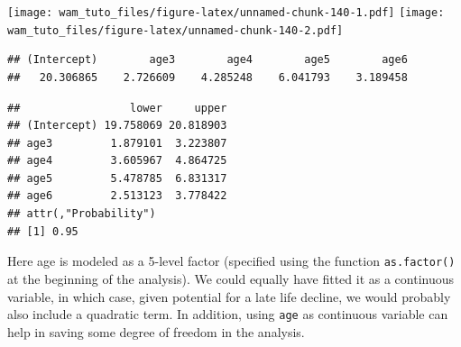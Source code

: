 \documentclass[
  12pt,
]{book}
\newenvironment{Shaded}{\begin{snugshade}}{\end{snugshade}}
\newcommand{\FloatTok}[1]{\textcolor[rgb]{0.00,0.00,0.81}{#1}}
\newcommand{\KeywordTok}[1]{\textcolor[rgb]{0.13,0.29,0.53}{\textbf{#1}}}
\newcommand{\NormalTok}[1]{#1}
\newcommand{\OperatorTok}[1]{\textcolor[rgb]{0.81,0.36,0.00}{\textbf{#1}}}
\begin{document}
\begin{Shaded}
\end{Shaded}

\texttt{[image: wam\_tuto\_files/figure-latex/unnamed-chunk-140-1.pdf]} \texttt{[image: wam\_tuto\_files/figure-latex/unnamed-chunk-140-2.pdf]}

\begin{Shaded}
\end{Shaded}

\begin{verbatim}
## (Intercept)        age3        age4        age5        age6 
##   20.306865    2.726609    4.285248    6.041793    3.189458
\end{verbatim}

\begin{Shaded}
\end{Shaded}

\begin{verbatim}
##                 lower     upper
## (Intercept) 19.758069 20.818903
## age3         1.879101  3.223807
## age4         3.605967  4.864725
## age5         5.478785  6.831317
## age6         2.513123  3.778422
## attr(,"Probability")
## [1] 0.95
\end{verbatim}

Here age is modeled as a 5-level factor (specified using the function \texttt{as.factor()} at the beginning of the analysis). We could equally have fitted it as a continuous variable, in which case, given potential for a late life decline, we would probably also include a quadratic term.
In addition, using \texttt{age} as continuous variable can help in saving some degree of freedom in the analysis.
\end{document}
